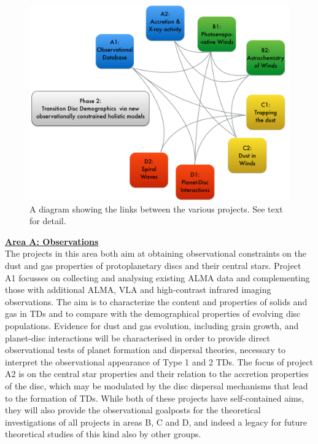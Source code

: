 \documentclass[10pt,fleqn,twoside]{article}
\newcommand{\AreacolA}{\color{blue}}
\begin{document}
\begin{figure}
\centerline{\includegraphics[width=13cm]{figures/dependency2.jpg}}
\caption{\label{fig-diagram-links}A diagram showing the links between the various
projects. See text for detail.}
\end{figure}


%
\noindent\underline{{\bf\AreacolA Area A: Observations}}\\
\noindent The projects in this area both aim at obtaining
observational constraints on the dust and gas properties of
protoplanetary discs and their central stars. Project A1 focusses on
collecting and analysing existing ALMA data and complementing those
with additional ALMA, VLA and high-contrast infrared imaging observations. 
The aim is to characterize the content and properties of solids and gas in TDs 
and to compare with the demographical properties of evolving disc populations. 
Evidence for dust and gas evolution, including grain growth,
and planet-disc interactions will be characterised in order to provide
direct observational tests of planet formation and dispersal theories,
necessary to interpret the observational appearance of Type 1 and 2
TDs. The focus of project A2 is on the central star properties and
their relation to the accretion properties of the disc, which may be
modulated by the disc dispersal mechanisms that lead to the formation
of TDs. While both of these projects have self-contained aims, they
will also provide the observational goalposts for the theoretical
investigations of all projects in areas B, C and D, and indeed a
legacy for future theoretical studies of this kind also by other
groups.  
\end{document}
